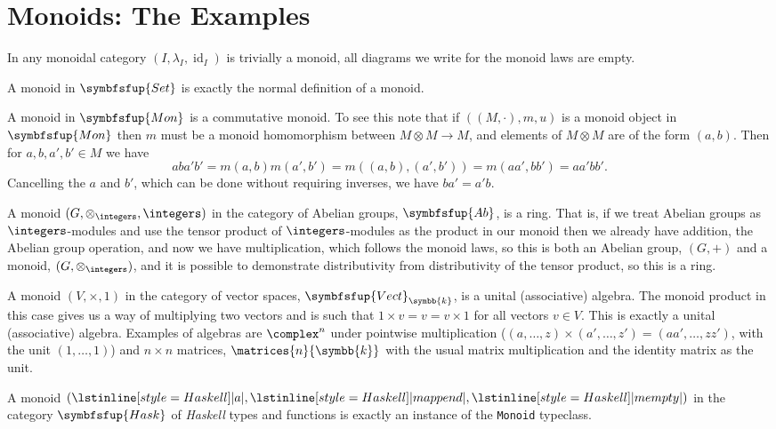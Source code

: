 \documentclass[fleqn]{NotesClass}
\makeatletter
\newcommand{\Haskell}{\textit{Haskell}}
\newcommand{\c@egory}[1]{\symbfsfup{#1}}
\newcommand{\Set}{\c@egory{Set}}
\renewcommand{\field}{\symbb{k}}
\newcommand{\Vect}[1][\field]{{\c@egory{Vect}_{#1}}}
\newcommand{\Mon}{\c@egory{Mon}}
\newcommand{\Ab}{\c@egory{Ab}}
\newcommand{\Hask}{\c@egory{Hask}}
\DeclareMathOperator{\id}{id}
\makeatother
\begin{document}
    \section{Monoids: The Examples}
    In any monoidal category \((I, \lambda_I, \id_I)\) is trivially a monoid, all diagrams we write for the monoid laws are empty.
    
    A monoid in \(\Set\) is exactly the normal definition of a monoid.
    
    A monoid in \(\Mon\) is a commutative monoid.
    To see this note that if \(((M, \cdot), m, u)\) is a monoid object in \(\Mon\) then \(m\) must be a monoid homomorphism between \(M \otimes M \to M\), and elements of \(M \otimes M\) are of the form \((a, b)\).
    Then for \(a, b, a', b' \in M\) we have
    \begin{equation}
        aba'b' = m(a, b)m(a', b') = m((a,b), (a',b')) = m(aa',bb') = aa'bb'.
    \end{equation}
    Cancelling the \(a\) and \(b'\), which can be done without requiring inverses, we have \(ba' = a'b\).
    
    A monoid \((G, \otimes_{\integers}, \integers)\) in the category of Abelian groups, \(\Ab\), is a ring.
    That is, if we treat Abelian groups as \(\integers\)-modules and use the tensor product of \(\integers\)-modules as the product in our monoid then we already have addition, the Abelian group operation, and now we have multiplication, which follows the monoid laws, so this is both an Abelian group, \((G, +)\) and a monoid, \((G, \otimes_{\integers})\), and it is possible to demonstrate distributivity from distributivity of the tensor product, so this is a ring.
    
    A monoid \((V, \times, 1)\) in the category of vector spaces, \(\Vect\), is a unital (associative) algebra.
    The monoid product in this case gives us a way of multiplying two vectors and is such that \(1\times v = v = v\times 1\) for all vectors \(v \in V\).
    This is exactly a unital (associative) algebra.
    Examples of algebras are \(\complex^n\) under pointwise multiplication (\((a, \dotsc, z) \times (a', \dotsc, z') = (aa', \dotsc, zz')\), with the unit \((1, \dotsc, 1)\)) and \(n \times n\) matrices, \(\matrices{n}{\field}\) with the usual matrix multiplication and the identity matrix as the unit.
    
    A monoid \((\lstinline[style=Haskell]|a|, \lstinline[style=Haskell]|mappend|, \lstinline[style=Haskell]|mempty|)\) in the category \(\Hask\) of \Haskell{} types and functions is exactly an instance of the \lstinline[style=Haskell]|Monoid| typeclass.
    
\end{document}
